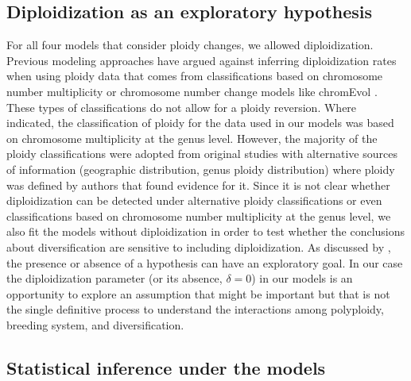 

\subsection{Diploidization as an exploratory hypothesis}

For all four models that consider ploidy changes, we allowed diploidization.
Previous modeling approaches \citep{mayrose_2011} have argued against inferring diploidization rates when using ploidy data that comes from classifications based on chromosome number multiplicity or chromosome number change models like chromEvol \citep{mayrose_2010}.
These types of classifications do not allow for a ploidy reversion.
Where indicated, the classification of ploidy for the data used in our models was based on chromosome multiplicity at the genus level.
However, the majority of the ploidy classifications were adopted from original studies with alternative sources of information (\eg geographic distribution, genus ploidy distribution) where ploidy was defined by authors that found evidence for it.
Since it is not clear whether diploidization can be detected under alternative ploidy classifications or even classifications based on chromosome number multiplicity at the genus level, we also fit the models without diploidization in order to test  whether the conclusions about diversification are sensitive to including diploidization.
As discussed by \citet{servedio_2014}, the presence or absence of a hypothesis can have an exploratory goal.
In our case the diploidization parameter (or its absence, $\delta=0$) in our models is an opportunity to explore an assumption that might be important but that is not the single definitive process to understand the interactions among polyploidy, breeding system, and diversification.

\subsection{Statistical inference under the models}

